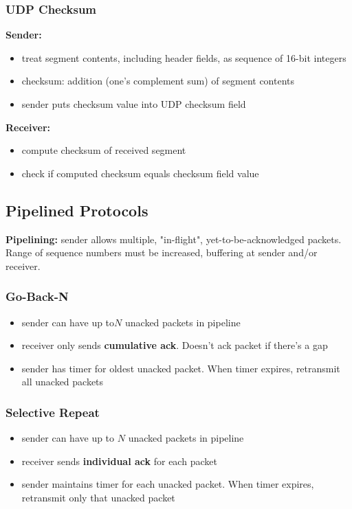 \subsubsection{UDP Checksum}
\textbf{Sender:}
\begin{itemize}
	\item treat segment contents, including header fields, as sequence of 16-bit integers
	\item checksum: addition (one's complement sum) of segment contents
	\item sender puts checksum value into UDP checksum field
\end{itemize}
\textbf{Receiver:}
\begin{itemize}
	\item compute checksum of received segment
	\item check if computed checksum equals checksum field value
\end{itemize}

\subsection{Pipelined Protocols}
\begin{leftbar}
	\textbf{Pipelining:} sender allows multiple, "in-flight", yet-to-be-acknowledged packets. Range of sequence numbers must be increased, buffering at sender and/or receiver.
\end{leftbar}
\subsubsection{Go-Back-N}
\begin{itemize}
	\item sender can have up to$N$ unacked packets in pipeline
	\item receiver only sends \textbf{cumulative ack}. Doesn't ack packet if there's a gap
	\item sender has timer for oldest unacked packet. When timer expires, retransmit all unacked packets
\end{itemize}
\subsubsection{Selective Repeat}
\begin{itemize}
	\item sender can have up to $N$ unacked packets in pipeline
	\item receiver sends \textbf{individual ack} for each packet
	\item sender maintains timer for each unacked packet. When timer expires, retransmit only that unacked packet
\end{itemize}